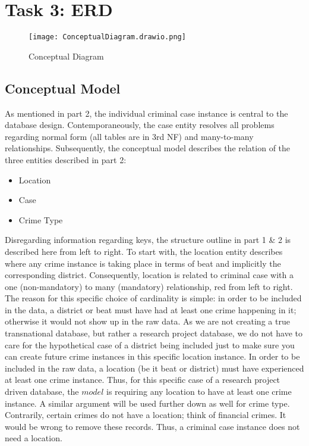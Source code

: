 \documentclass[a4paper]{article}
\begin{document}
\pagebreak


\section{Task 3: ERD}



\begin{figure}[htp]
		\centering
		\texttt{[image: ConceptualDiagram.drawio.png]}
         \small
         \caption{Conceptual Diagram}
\end{figure}



\subsection{Conceptual Model}
As mentioned in part 2, the individual criminal case instance is central to the database design. Contemporaneously, the case entity resolves all problems regarding normal form (all tables are in 3rd NF) and many-to-many relationships. Subsequently, the conceptual model describes the relation of the three entities described in part 2: 

\begin{itemize}
  \item Location
  \item Case
  \item Crime Type
\end{itemize}

\indent Disregarding information regarding keys, the structure outline in part 1 \& 2 is described here from left to right. To start with, the location entity describes where any crime instance is taking place in terms of beat and implicitly the corresponding district. Consequently, location is related to criminal case with a one (non-mandatory) to many (mandatory) relationship, red from left to right. 
The reason for this specific choice of cardinality is simple: in order to be included in the data, a district or beat must have had at least one crime happening in it; otherwise it would not show up in the raw data. As we are not creating a true transnational database, but rather a research project database, we do not have to care for the hypothetical case of a district being included just to make sure you can create future crime instances in this specific location instance. In order to be included in the raw data, a location (be it beat or district) must have experienced at least one crime instance. Thus, for this specific case of a research project driven database, the $model$ is requiring any location to have at least one crime instance. A similar argument will be used further down as well for crime type. Contrarily, certain crimes do not have a location; think of financial crimes. It would be wrong to remove these records. Thus, a criminal case instance does not need a location.
\end{document}
